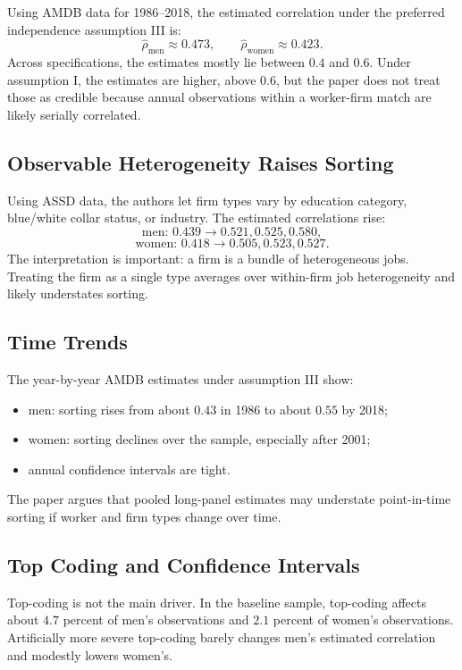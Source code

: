 \documentclass[11pt]{article}
\begin{document}
Using AMDB data for 1986--2018, the estimated correlation under the preferred independence assumption III is:
\[
  \widehat\rho_{\text{men}}\approx 0.473,
  \qquad
  \widehat\rho_{\text{women}}\approx 0.423.
\]
Across specifications, the estimates mostly lie between $0.4$ and $0.6$. Under assumption I, the estimates are higher, above $0.6$, but the paper does not treat those as credible because annual observations within a worker-firm match are likely serially correlated.

\subsection{Observable Heterogeneity Raises Sorting}

Using ASSD data, the authors let firm types vary by education category, blue/white collar status, or industry. The estimated correlations rise:
\[
  \text{men: }0.439\to 0.521,0.525,0.580,
\]
\[
  \text{women: }0.418\to 0.505,0.523,0.527.
\]
The interpretation is important: a firm is a bundle of heterogeneous jobs. Treating the firm as a single type averages over within-firm job heterogeneity and likely understates sorting.

\subsection{Time Trends}

The year-by-year AMDB estimates under assumption III show:
\begin{itemize}[leftmargin=*]
  \item men: sorting rises from about $0.43$ in 1986 to about $0.55$ by 2018;
  \item women: sorting declines over the sample, especially after 2001;
  \item annual confidence intervals are tight.
\end{itemize}
The paper argues that pooled long-panel estimates may understate point-in-time sorting if worker and firm types change over time.

\subsection{Top Coding and Confidence Intervals}

Top-coding is not the main driver. In the baseline sample, top-coding affects about $4.7$ percent of men's observations and $2.1$ percent of women's observations. Artificially more severe top-coding barely changes men's estimated correlation and modestly lowers women's.
\end{document}
